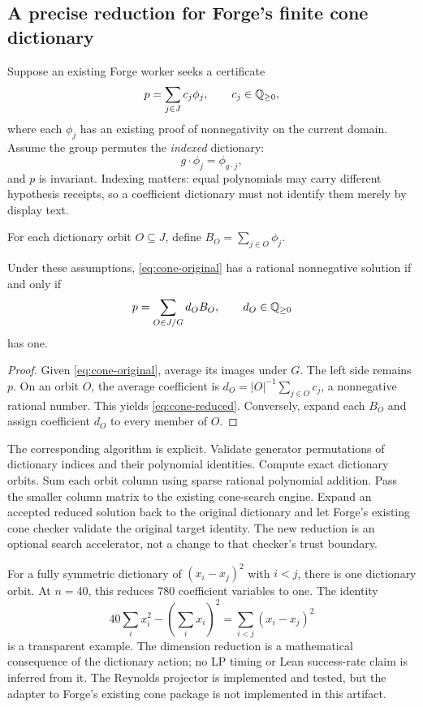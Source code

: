 \subsection{A precise reduction for Forge's finite cone dictionary}
Suppose an existing Forge worker seeks a certificate
\begin{equation}
  p=\sum_{j\in J}c_j\phi_j,\qquad c_j\in\mathbb Q_{\geq0},
  \label{eq:cone-original}
\end{equation}
where each $\phi_j$ has an existing proof of nonnegativity on the current domain. Assume the group permutes the \emph{indexed} dictionary:
\[
  g\cdot\phi_j=\phi_{g\cdot j},
\]
and $p$ is invariant. Indexing matters: equal polynomials may carry different hypothesis receipts, so a coefficient dictionary must not identify them merely by display text.

For each dictionary orbit $O\subseteq J$, define $B_O=\sum_{j\in O}\phi_j$.
\begin{theorem}
\label{thm:cone}
Under these assumptions, \eqref{eq:cone-original} has a rational nonnegative solution if and only if
\begin{equation}
  p=\sum_{O\in J/G}d_OB_O,\qquad d_O\in\mathbb Q_{\geq0}
  \label{eq:cone-reduced}
\end{equation}
has one.
\end{theorem}
\begin{proof}
Given \eqref{eq:cone-original}, average its images under $G$. The left side remains $p$. On an orbit $O$, the average coefficient is
$d_O=|O|^{-1}\sum_{j\in O}c_j$, a nonnegative rational number. This yields \eqref{eq:cone-reduced}. Conversely, expand each $B_O$ and assign coefficient $d_O$ to every member of $O$.
\end{proof}

The corresponding algorithm is explicit. Validate generator permutations of dictionary indices and their polynomial identities. Compute exact dictionary orbits. Sum each orbit column using sparse rational polynomial addition. Pass the smaller column matrix to the existing cone-search engine. Expand an accepted reduced solution back to the original dictionary and let Forge's existing cone checker validate the original target identity. The new reduction is an optional search accelerator, not a change to that checker's trust boundary.

For a fully symmetric dictionary of $(x_i-x_j)^2$ with $i<j$, there is one dictionary orbit. At $n=40$, this reduces 780 coefficient variables to one. The identity
\[
  40\sum_i x_i^2-\left(\sum_i x_i\right)^2
  =\sum_{i<j}(x_i-x_j)^2
\]
is a transparent example. The dimension reduction is a mathematical consequence of the dictionary action; no LP timing or Lean success-rate claim is inferred from it. The Reynolds projector is implemented and tested, but the adapter to Forge's existing cone package is not implemented in this artifact.

